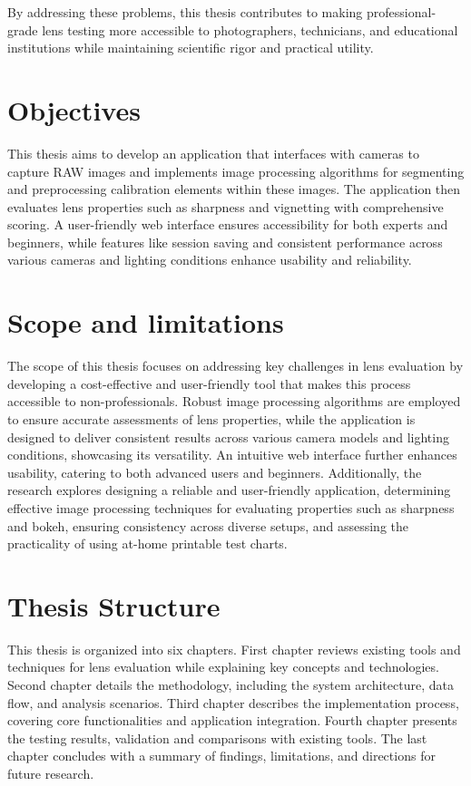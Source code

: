 By addressing these problems, this thesis contributes to making professional-grade lens testing more accessible to photographers, technicians, and educational institutions while maintaining scientific rigor and practical utility.

\section*{Objectives}
This thesis aims to develop an application that interfaces with cameras to capture RAW images and implements image processing algorithms for segmenting and preprocessing calibration elements within these images. The application then evaluates lens properties such as sharpness and vignetting with comprehensive scoring. A user-friendly web interface ensures accessibility for both experts and beginners, while features like session saving and consistent performance across various cameras and lighting conditions enhance usability and reliability.

\section*{Scope and limitations}

The scope of this thesis focuses on addressing key challenges in lens evaluation by developing a cost-effective and user-friendly tool that makes this process accessible to non-professionals. Robust image processing algorithms are employed to ensure accurate assessments of lens properties, while the application is designed to deliver consistent results across various camera models and lighting conditions, showcasing its versatility. An intuitive web interface further enhances usability, catering to both advanced users and beginners. Additionally, the research explores designing a reliable and user-friendly application, determining effective image processing techniques for evaluating properties such as sharpness and bokeh, ensuring consistency across diverse setups, and assessing the practicality of using at-home printable test charts.

\section*{Thesis Structure}
This thesis is organized into six chapters. First chapter reviews existing tools and techniques for lens evaluation while explaining key concepts and technologies. Second chapter details the methodology, including the system architecture, data flow, and analysis scenarios. Third chapter describes the implementation process, covering core functionalities and application integration. Fourth chapter presents the testing results, validation and comparisons with existing tools. The last chapter concludes with a summary of findings, limitations, and directions for future research.
